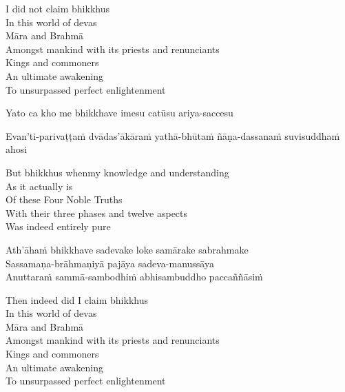 \begin{english-verses}
  I did not claim bhikkhus\\
  In this world of devas\\
  Māra and Brahmā\\
  Amongst mankind with its priests and renunciants\\
  Kings and commoners\\
  An ultimate awakening\\
  To unsurpassed perfect enlightenment
\end{english-verses}

Yato ca kho me bhikkhave imesu catūsu ariya-saccesu
\begin{pali-hangtogether}
  Evan'ti-parivaṭṭaṁ dvādas'ākāraṁ yathā-bhūtaṁ ñāṇa-dassanaṁ suvisuddhaṁ ahosi
\end{pali-hangtogether}

\begin{english-verses}
  But bhikkhus when\ifdigitalversion\makeatletter\hyperlink{endnote159-appendix}\makeatother \thinspace\fi my knowledge and understanding\\
  As it actually is\\
  Of these Four Noble Truths\\
  With their three phases and twelve aspects\\
  Was indeed entirely pure
\end{english-verses}

Ath'āhaṁ bhikkhave sadevake loke samārake sabrahmake\\
Sassamaṇa-brāhmaṇiyā pajāya sadeva-manussāya\\
Anuttaraṁ sammā-sambodhiṁ abhisambuddho paccaññāsiṁ

\begin{english-verses}
  Then indeed did I claim bhikkhus\\
  In this world of devas\\
  Māra and Brahmā\\
  Amongst mankind with its priests and renunciants\\
  Kings and commoners\\
  \ifbfiveversion\clearpage\fi
  An ultimate awakening\\
  To unsurpassed perfect enlightenment
\end{english-verses}

